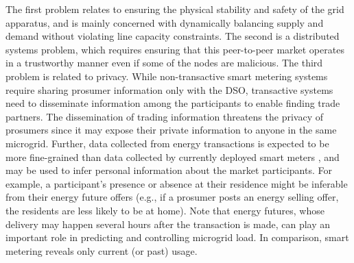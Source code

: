 The first problem relates to ensuring the physical stability and safety of the grid apparatus, and is mainly concerned with dynamically balancing supply and demand without violating line capacity constraints. The second is a distributed systems problem, which requires ensuring that this peer-to-peer market operates in a trustworthy manner even if some of the nodes are malicious. The third problem is related to privacy. 
While non-transactive smart metering systems require sharing prosumer information only with the DSO, transactive systems need to disseminate information among the participants to enable finding trade partners.
The dissemination of trading information threatens the privacy of prosumers since it  may expose their private information to anyone in the same microgrid. 
Further,
data collected from energy transactions is expected to be more fine-grained than data collected by currently deployed smart meters \cite{Privacy2017}, and may be used to infer personal information about the market participants. For example, a participant's presence or absence at their residence might be inferable from their energy future offers (e.g., if a prosumer posts an energy selling offer, the residents are less likely to be at home).
  Note that energy futures,
  whose delivery may happen several hours after  the transaction
  is made, can play an important role in predicting and controlling
  microgrid load.  In comparison, smart metering reveals only current
  (or past) usage.



